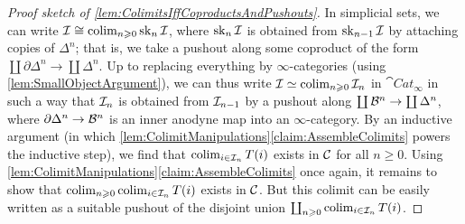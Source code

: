 \begin{proof}[Proof sketch of \cref{lem:ColimitsIffCoproductsAndPushouts}]
	In simplicial sets, we can write $\mathcal{I}\cong \operatorname*{colim}_{n\geqslant 0}\operatorname{sk}_n\mathcal{I}$, where $\operatorname{sk}_{n}\mathcal{I}$ is obtained from $\operatorname{sk}_{n-1}\mathcal{I}$ by attaching copies of $\Delta^n$; that is, we take a pushout along some coproduct of the form $\coprod \partial\Delta^n\rightarrow \coprod\Delta^n$. Up to replacing everything by $\infty$-categories (using \cref{lem:SmallObjectArgument}), we can thus write $\mathcal{I}\simeq \operatorname*{colim}_{n\geqslant 0}\mathcal{I}_n$ in $\cat{Cat}_\infty$ in such a way that $\mathcal{I}_n$ is obtained from $\mathcal{I}_{n-1}$ by a pushout along $\coprod \mathcal{B}^n\rightarrow \coprod \Delta^n$, where $\partial\Delta^n\rightarrow \mathcal{B}^n$ is an inner anodyne map into an $\infty$-category. By an inductive argument (in which \cref{lem:ColimitManipulations}\cref{claim:AssembleColimits} powers the inductive step), we find that $\operatorname*{colim}_{i\in\mathcal{I}_n}T(i)$ exists in $\mathcal{C}$ for all $n\geqslant 0$. Using \cref{lem:ColimitManipulations}\cref{claim:AssembleColimits} once again, it remains to show that $\operatorname*{colim}_{n\geqslant 0}\operatorname*{colim}_{i\in\mathcal{I}_n}T(i)$ exists in $\mathcal{C}$. But this colimit can be easily written as a suitable pushout of the disjoint union $\coprod_{n\geqslant 0}\operatorname*{colim}_{i\in\mathcal{I}_n}T(i)$.
\end{proof}
